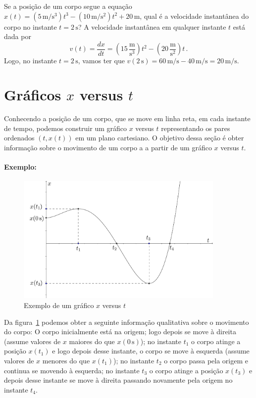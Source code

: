 \documentclass[12pt, a4paper]{article}
\newcommand{\dpar}[1]{\left(#1\right)}
\newcommand{\un}[1]{\mathrm{#1}}
\begin{document}
Se a posição de um corpo segue a equação $x(t)=(5\,\un m/\un{s}^3)t^3-(10\,\un m/\un{s}^2)t^2+20\,\un m$, qual é a velocidade instantânea do corpo no instante $t=2\,\un s$? A velocidade instantânea em qualquer instante $t$ está dada por
$$v(t)=\frac{dx}{dt}=\dpar{15\,\frac{\un m}{\un{s}^3}}t^2-\dpar{20\,\frac{\un m}{\un{s}^2}}t\,.$$
Logo, no instante $t=2\,\un s$, vamos ter que $v(2\,\un s)=60\,\un m/\un s-40\,\un m/\un s=20\,\un m/\un s$.

\section{Gráficos $x$ versus $t$}
Conhecendo a posição de um corpo, que se move em linha reta, em cada instante de tempo, podemos construir um gráfico $x$ versus $t$ representando os pares ordenados $(t,x(t))$ em um plano cartesiano. O objetivo dessa seção é obter informação sobre o movimento de um corpo a a partir de um gráfico $x$ versus $t$.

\paragraph{Exemplo:}
\begin{figure}[t]
  \centering
  \includegraphics[width=0.9\textwidth,keepaspectratio]{2-movimento-retilineo-fig1.pdf}
  \caption{Exemplo de um gráfico $x$ versus $t$}
  \label{fig1}
\end{figure}
Da figura~\ref{fig1} podemos obter a seguinte informação qualitativa sobre o movimento do corpo: O corpo inicialmente está na origem; logo depois se move à direita (assume valores de $x$ maiores do que $x(0\,\un s)$); no instante $t_1$ o corpo atinge a posição $x(t_1)$ e logo depois desse instante, o corpo se move à esquerda (assume valores de $x$ menores do que $x(t_1)$); no instante $t_2$ o corpo passa pela origem e continua se movendo à esquerda; no instante $t_3$ o corpo atinge a posição $x(t_3)$ e depois desse instante se move à direita passando novamente pela origem no instante $t_4$.
\end{document}
